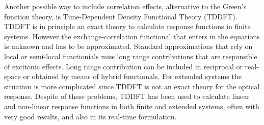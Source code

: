 Another possible way to include correlation effects, alternative to the Green's function theory, is Time-Dependent Density Functional Theory (TDDFT)\cite{PhysRevLett.52.997}. TDDFT is in principle an exact theory to calculate response functions in finite systems. However the exchange-correlation functional that enters in the equations is unknown and has to be approximated. Standard approximations that rely on local or semi-local functionials miss long range contributions that are responsible of excitonic effects\cite{botti2007time}. Long range contribution can be included in reciprocal or real-space or obtained by means of hybrid functionals\cite{botti2007time,faber2014excited}. For extended systems the situation is more complicated since TDDFT is not an exact theory for the optical response. %
Despite of these problems, TDDFT has been used to calculate linear and non-linear response functions in both finite and extended systems, often with very good results, and also in its real-time formulation.\cite{takimoto:154114,andrade2007time} 

